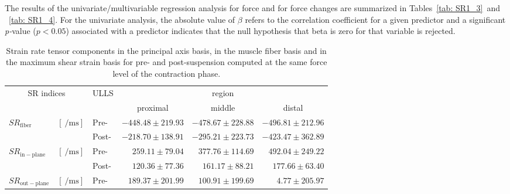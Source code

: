 The results of the univariate/multivariable regression analysis for force and for force changes are summarized in Tables~\ref{tab: SR1_3}~and ~\ref{tab: SR1_4}.
For the univariate analysis, the absolute value of $\beta$ refers to the correlation coefficient for a given predictor and a significant \textit{p-}value ($p < 0.05$) associated with a predictor indicates that the null hypothesis that beta is zero for that variable is rejected.
\begin{landscape}
\centering
\begin{table}[!h]
\vspace{+0.2cm}
\caption[Strain rate indices for pre- and post-suspension computed at the same force level of the contraction phase]{Strain rate tensor components in the principal axis basis, in the muscle fiber basis and in the maximum shear strain basis for pre- and post-suspension computed at the same force level of the contraction phase.}
\label{tab: SR1_2}
\begin{center}
\begin{threeparttable}
\begin{tabular}{@{}lllrrr@{}}
\toprule[1pt]\midrule[0.3pt]
\multicolumn{2}{c}{\multirow{2}{*}{SR indices}} & \multirow{2}{*}{ULLS} & \multicolumn{3}{c}{region}                         \\ \cmidrule(lr){4-6} 
\multicolumn{2}{c}{}                             &                       & \multicolumn{1}{c}{proximal} & \multicolumn{1}{c}{middle} & \multicolumn{1}{c}{distal}        \\ \cmidrule(){1-6}
\multirow{2}{*}{$SR_{\mathrm{fiber}}$}           & \multirow{2}{*}{$\left[ \SI{}{\per\milli\second}\right]$} 		& Pre-  & $-448.48 \pm 219.93$ & $-478.67 \pm 228.88$  & $-496.81 \pm 212.96$ \\
                                                 &														 	 		& Post- & $-218.70 \pm 138.91$ & $-295.21 \pm 223.73$  & $-423.47 \pm 362.89$ \\ [6pt]
\multirow{2}{*}{$SR_{\mathrm{in-plane}}$\tnote{1,2,3}}  & \multirow{2}{*}{$\left[ \SI{}{\per\milli\second}\right]$} & Pre-  & $259.11  \pm 79.04$  & $377.76  \pm 114.69$  & $492.04 \pm 249.22$  \\
                                                 &  														 			& Post- & $120.36  \pm 77.36$  & $161.17  \pm 88.21$   & $177.66 \pm 63.40$   \\ [6pt]
\multirow{2}{*}{$SR_{\mathrm{out-plane}}$\tnote{4}}     & \multirow{2}{*}{$\left[ \SI{}{\per\milli\second}\right]$} & Pre-  & $189.37  \pm 201.99$ & $100.91  \pm 199.69$  & $4.77 \pm 205.97$    \\

\end{tabular}
\end{threeparttable}
\end{center}
\end{table}
\end{landscape}
